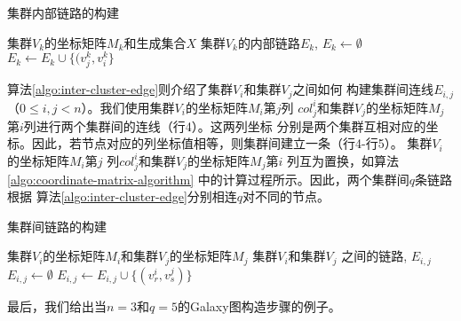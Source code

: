 \begin{algorithm}[t]
  \centering
  \caption{集群内部链路的构建}
  \label{algo:intra-cluster-edge}
  \begin{algorithmic}[1]
  \REQUIRE 集群$V_k$的坐标矩阵$M_k$和生成集合$X$
  \ENSURE 集群$V_k$的内部链路$E_k$,
  \STATE $E_k \leftarrow \emptyset$
        \STATE $E_k \leftarrow E_k \cup \{(v_j^k,v_i^k\}$
      \ENDIF
    \ENDFOR
  \ENDFOR
  \end{algorithmic}
\end{algorithm}

算法\ref{algo:inter-cluster-edge}则介绍了集群$V_i$和集群$V_j$之间如何
构建集群间连线$E_{i,j}$（$0 \le i,j < n$）。我们使用集群$V_i$的坐标矩阵$M_i$第$j$列
$col_j^i$和集群$V_j$的坐标矩阵$M_j$第$i$列进行两个集群间的连线（行4）。这两列坐标
分别是两个集群互相对应的坐标。因此，若节点对应的列坐标值相等，则集群间建立一条（行4-行5）。
集群$V_i$的坐标矩阵$M_i$第$j$ 列$col_j^i$和集群$V_j$的坐标矩阵$M_j$第$i$ 列互为置换，如算法
\ref{algo:coordinate-matrix-algorithm} 中的计算过程所示。因此，两个集群间$q$条链路根据
算法\ref{algo:inter-cluster-edge}分别相连$q$对不同的节点。


\begin{algorithm}[t]
  \centering
  \caption{集群间链路的构建}
  \label{algo:inter-cluster-edge}
  \begin{algorithmic}[1]
  \REQUIRE 集群$V_i$的坐标矩阵$M_i$和集群$V_j$的坐标矩阵$M_j$
  \ENSURE 集群$V_i$和集群$V_j$ 之间的链路, $E_{i,j}$
  \STATE $E_{i,j} \leftarrow \emptyset$
        \STATE $E_{i,j} \leftarrow E_{i,j} \cup \{(v_r^i,v_s^j)\}$
      \ENDIF
    \ENDFOR
  \ENDFOR
  \end{algorithmic}
\end{algorithm}

最后，我们给出当$n=3$和$q=5$的Galaxy图构造步骤的例子。



